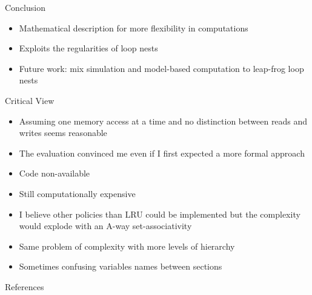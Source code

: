 \documentclass{beamer}
\begin{document}
\begin{frame}{Conclusion}
  \begin{itemize}
    \item Mathematical description for more flexibility in computations
    \item Exploits the regularities of loop nests
    \item Future work: mix simulation and model-based computation to leap-frog loop nests
  \end{itemize}
\end{frame}

\begin{frame}{Critical View}
  \begin{itemize}[<+->]
    \item Assuming one memory access at a time and no distinction between reads and writes seems reasonable
    \item The evaluation convinced me even if I first expected a more formal approach
    \item Code non-available
    \item Still computationally expensive
    \item I believe other policies than LRU could be implemented but the complexity would explode with an A-way set-associativity
    \item Same problem of complexity with more levels of hierarchy
    \item Sometimes confusing variables names between sections
  \end{itemize}
\end{frame}

\appendix

\begin{frame}[allowframebreaks]{References}
  
  
\end{frame}
\end{document}
